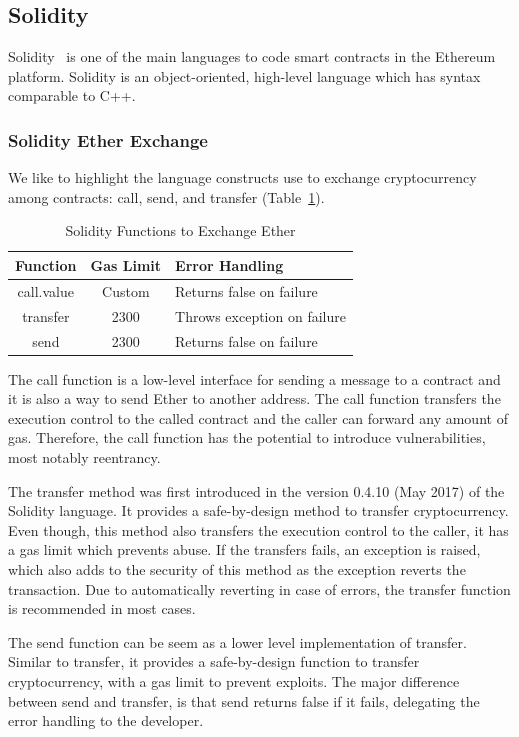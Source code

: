 \documentclass[10pt,conference]{IEEEtran}
\begin{document}
\subsection{Solidity}

Solidity~\cite{solidity} is one of the main languages to code smart contracts in the Ethereum platform.  Solidity is an object-oriented, high-level language which has syntax comparable to C++.  

\subsubsection{Solidity Ether Exchange}

We like to highlight the language constructs use to exchange cryptocurrency among contracts: call, send, and transfer (Table~\ref{tab:freq}).

\begin{table}
\center
  \caption{Solidity Functions to Exchange Ether}
  \label{tab:freq}
  \begin{tabular}{ccl}
    \hline
    Function & Gas Limit & Error Handling\\
    \hline
    call.value & Custom & Returns false on failure\\
    transfer & 2300 & Throws exception on failure\\
    send & 2300 & Returns false on failure\\
  \hline
\end{tabular}
\end{table}

The call function is a low-level interface for sending a message to a contract and it is also a way to send Ether to another address.  The call function transfers the execution control to the called contract and the caller can forward any amount of gas.  Therefore,  the call function has the potential to introduce vulnerabilities, most notably reentrancy.  

The transfer method was first introduced in the version 0.4.10 (May 2017) of the Solidity language.  It provides a safe-by-design method to transfer cryptocurrency.  Even though, this method also transfers the execution control to the caller,  it has a gas limit which prevents abuse.  If the transfers fails,  an exception is raised, which also adds to the security of this method as the exception reverts the transaction.  Due to automatically reverting in case of errors, the transfer function is recommended in most cases. 

The send function can be seem as a lower level implementation of transfer. Similar to transfer,  it provides a safe-by-design function to transfer cryptocurrency,  with a gas limit to prevent exploits. The major difference between send and transfer, is that send returns false if it fails, delegating the error handling to the developer.
\end{document}

